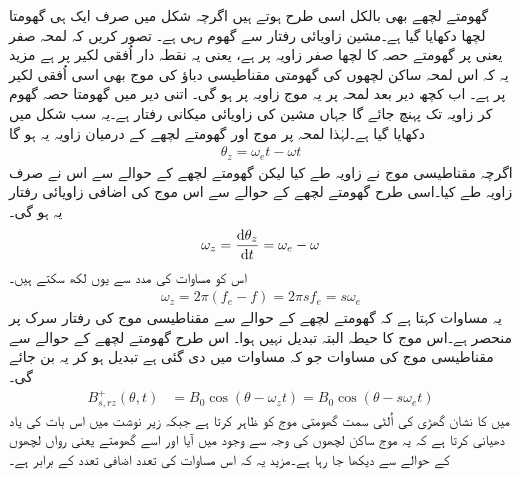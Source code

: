 گھومتے لچھے بھی بالکل اسی طرح ہوتے ہیں اگرچہ شکل میں صرف ایک ہی گھومتا لچھا دکھایا گیا ہے۔مشین  زاویائی رفتار سے گھوم رہی ہے۔ تصور کریں کہ لمحہ صفر یعنی  پر گھومتے حصہ کا   لچھا صفر زاویہ پر ہے، یعنی یہ نقطہ دار اُفقی لکیر پر ہے مزید یہ کہ اس لمحہ ساکن لچھوں کی گھومتی مقناطیسی دباؤ کی موج بھی اسی اُفقی لکیر پر ہے۔ اب کچھ دیر بعد لمحہ  پر یہ موج زاویہ   پر ہو گی۔ اتنی دیر میں گھومتا حصہ گھوم کر زاویہ   تک پہنچ جائے گا جہاں   مشین کی زاویائی میکانی رفتار ہے۔یہ سب شکل میں دکھایا گیا ہے۔لہٰذا لمحہ  پر موج اور گھومتے لچھے کے درمیان زاویہ  یہ ہو گا
\begin{align}
\theta_z=\omega_e t -\omega t
\end{align}
اگرچہ مقناطیسی موج نے  زاویہ طے کیا لیکن گھومتے لچھے کے حوالے سے اس نے صرف  زاویہ  طے کیا۔اسی طرح گھومتے لچھے کے حوالے سے اس موج کی  اضافی زاویائی رفتار  یہ ہو گی۔
\begin{align}
\omega_z=\frac{\dif \theta_z}{\dif t}=\omega_e -\omega
\end{align}
اس کو مساوات  کی مدد سے یوں لکھ سکتے ہیں۔
\begin{align}
\omega_z=2 \pi (f_e-f)=2 \pi s f_e = s \omega_e
\end{align}
یہ مساوات کہتا ہے کہ گھومتے لچھے کے حوالے سے مقناطیسی موج کی رفتار سرک  پر منحصر ہے۔اس موج کا حیطہ البتہ تبدیل نہیں ہوا۔ اس طرح گھومتے لچھے کے حوالے سے مقناطیسی موج کی مساوات جو کہ مساوات   میں دی گئی ہے تبدیل ہو کر یہ بن جائے گی۔
\begin{align}
B_{s,rz}^+(\theta,t)&=B_0 \cos (\theta-\omega_z t)=B_0 \cos (\theta -s \omega_e t)
\end{align}
 میں  کا نشان  گھڑی کی اُلٹی سمت گھومتی موج کو ظاہر کرتا ہے جبکہ  زیر نوشت میں    اس بات کی یاد دھیانی کرتا ہے کہ یہ موج ساکن لچھوں کی وجہ سے وجود میں آیا اور اسے گھومتے یعنی رواں لچھوں کے حوالے سے دیکھا جا رہا ہے۔مزید یہ کہ اس مساوات کی تعدد اضافی تعدد  کے برابر ہے۔

